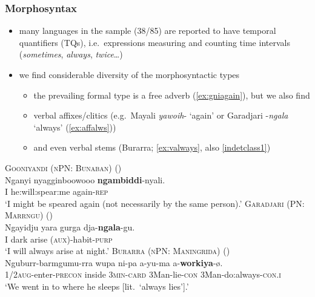 \documentclass{article}
\makeatletter
\newcommand{\ofy}{/85} %
\makeatother
\begin{document}
\subsubsection{Morphosyntax}
\label{sec:tqmorph}
\begin{itemize}
\item many languages in the sample (38\ofy) are reported to have temporal quantifiers (TQs), i.e.\ expressions measuring and counting time intervals (\textit{sometimes}, \textit{always}, \textit{twice}\ldots)
\item we find considerable diversity of the morphosyntactic types
  \begin{itemize}
  \item the prevailing formal type is a free adverb (\ref{ex:gniagain}), but we also find
  \item verbal affixes/clitics (e.g.\ Mayali \textit{yawoih}- `again' or Garadjari -\textit{ngala} `always' (\ref{ex:affalws}))
  \item and even verbal stems (Burarra; \ref{ex:valways}, also \ref{indetclass1})
  \end{itemize}
\end{itemize}

\begin{exe}
  \ex\label{ex:gniagain} \textsc{Gooniyandi (nPN: Bunaban)} (\citealt[462]{mcgregor90})\\
  \gll Nganyi nyagginboowooo \textbf{ngambiddi}-nyali.\\
  I he:will:spear:me again-\textsc{rep}\\
  \glt `I might be speared again (not necessarily by the same person).'
  \ex\label{ex:affalws} \textsc{Garadjari (PN: Marrngu)} (\citealt[42]{sands89})\\
  \gll Ngayidju yara gurga dja-\textbf{ngala}-gu.\\
  I dark arise (\textsc{aux})-habit-\textsc{purp}\\
  \glt `I will always arise at night.'
  \ex\label{ex:valways} \textsc{Burarra (nPN: Maningrida)} (\citealt[87]{green87})\\
  \gll Nguburr-barmgumu-rra wupa ni-pa a-yu-ma a-\textbf{workiya}-ø.\\
  \textsc{1/2aug}-enter-\textsc{precon} inside \textsc{3min-card}  3Man-lie-\textsc{con} 3Man-do:always-\textsc{con.i}\\
  \glt `We went in to where he sleeps [lit.\ `always lies'].'
\end{exe}
\end{document}
